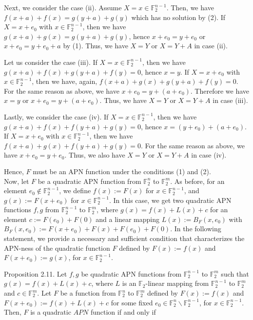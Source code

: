 \documentclass[10pt]{article}
\begin{document}
Next, we consider the case (ii). Assume $X=x \in \mathbb{F}_{2}^{n-1}$. Then, we have $f(x+ a)+f(x)=g(y+a)+g(y)$ which has no solution by (2). If $X=x+e_{0}$ with $x \in \mathbb{F}_{2}^{n-1}$, then we have $g(x+a)+g(x)=g(y+a)+g(y)$, hence $x+e_{0}=y+e_{0}$ or $x+e_{0}=y+e_{0}+a$ by (1). Thus, we have $X=Y$ or $X=Y+A$ in case (ii).

Let us consider the case (iii). If $X=x \in \mathbb{F}_{2}^{n-1}$, then we have $g(x+a)+f(x)+ g(y+a)+f(y)=0$, hence $x=y$. If $X=x+e_{0}$ with $x \in \mathbb{F}_{2}^{n-1}$, then we have, again, $f(x+a)+g(x)+g(y+a)+f(y)=0$. For the same reason as above, we have $x+e_{0}=y+\left(a+e_{0}\right)$. Therefore we have $x=y$ or $x+e_{0}=y+\left(a+e_{0}\right)$. Thus, we have $X=Y$ or $X=Y+A$ in case (iii).

Lastly, we consider the case (iv). If $X=x \in \mathbb{F}_{2}^{n-1}$, then we have $g(x+a)+f(x)+ f(y+a)+g(y)=0$, hence $x=\left(y+e_{0}\right)+\left(a+e_{0}\right)$. If $X=x+e_{0}$ with $x \in \mathbb{F}_{2}^{n-1}$, then we have $f(x+a)+g(x)+f(y+a)+g(y)=0$. For the same reason as above, we have $x+e_{0}=y+e_{0}$. Thus, we also have $X=Y$ or $X=Y+A$ in case (iv).

Hence, $F$ must be an APN function under the conditions (1) and (2).\\
Now, let $F$ be a quadratic APN function from $\mathbb{F}_{2}^{n}$ to $\mathbb{F}_{2}^{m}$. As before, for an element $e_{0} \notin \mathbb{F}_{2}^{n-1}$, we define $f(x):=F(x)$ for $x \in \mathbb{F}_{2}^{n-1}$, and $g(x):=F\left(x+e_{0}\right)$ for $x \in \mathbb{F}_{2}^{n-1}$. In this case, we get two quadratic APN functions $f, g$ from $\mathbb{F}_{2}^{n-1}$ to $\mathbb{F}_{2}^{m}$, where $g(x)=f(x)+L(x)+c$ for an element $c:=F\left(e_{0}\right)+F(0)$ and a linear mapping $L(x):=B_{F}\left(x, e_{0}\right)$ with $B_{F}\left(x, e_{0}\right):=F\left(x+e_{0}\right)+F(x)+F\left(e_{0}\right)+F(0)$. In the following statement, we provide a necessary and sufficient condition that characterizes the APN-ness of the quadratic function $F$ defined by $F(x):=f(x)$ and $F\left(x+e_{0}\right):=g(x)$, for $x \in \mathbb{F}_{2}^{n-1}$.

Proposition 2.11. Let $f, g$ be quadratic APN functions from $\mathbb{F}_{2}^{n-1}$ to $\mathbb{F}_{2}^{m}$ such that $g(x)=f(x)+L(x)+c$, where $L$ is an $\mathbb{F}_{2}$-linear mapping from $\mathbb{F}_{2}^{n-1}$ to $\mathbb{F}_{2}^{m}$ and $c \in \mathbb{F}_{2}^{m}$. Let $F$ be a function from $\mathbb{F}_{2}^{n}$ to $\mathbb{F}_{2}^{m}$ defined by $F(x):=f(x)$ and $F\left(x+e_{0}\right):= f(x)+L(x)+c$ for some fixed $e_{0} \in \mathbb{F}_{2}^{n} \backslash \mathbb{F}_{2}^{n-1}$, for $x \in \mathbb{F}_{2}^{n-1}$. Then, $F$ is a quadratic $A P N$ function if and only if
\end{document}
